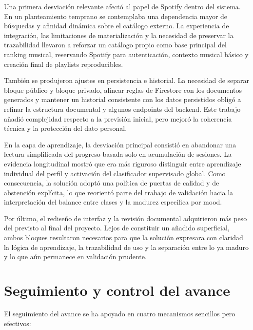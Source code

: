Una primera desviación relevante afectó al papel de Spotify dentro del sistema.
En un planteamiento temprano se contemplaba una dependencia mayor de búsquedas y
afinidad dinámica sobre el catálogo externo. La experiencia de integración, las
limitaciones de materialización y la necesidad de preservar la trazabilidad
llevaron a reforzar un catálogo propio como base principal del ranking musical,
reservando Spotify para autenticación, contexto musical básico y creación final
de playlists reproducibles.

También se produjeron ajustes en persistencia e historial. La necesidad de
separar bloque público y bloque privado, alinear reglas de Firestore con los
documentos generados y mantener un historial consistente con los datos
persistidos obligó a refinar la estructura documental y algunos endpoints del
backend. Este trabajo añadió complejidad respecto a la previsión inicial, pero
mejoró la coherencia técnica y la protección del dato personal.

En la capa de aprendizaje, la desviación principal consistió en abandonar una
lectura simplificada del progreso basada solo en acumulación de sesiones. La
evidencia longitudinal mostró que era más riguroso distinguir entre aprendizaje
individual del perfil y activación del clasificador supervisado global. Como
consecuencia, la solución adoptó una política de puertas de calidad y de
abstención explícita, lo que reorientó parte del trabajo de validación hacia la
interpretación del balance entre clases y la madurez específica por mood.

Por último, el rediseño de interfaz y la revisión documental adquirieron más
peso del previsto al final del proyecto. Lejos de constituir un añadido
superficial, ambos bloques resultaron necesarios para que la solución
expresara con claridad la lógica de aprendizaje, la trazabilidad de uso y la
separación entre lo ya maduro y lo que aún permanece en validación prudente.

\section{Seguimiento y control del avance}
\label{sec:seguimiento_control_avance}

El seguimiento del avance se ha apoyado en cuatro mecanismos sencillos pero
efectivos:

